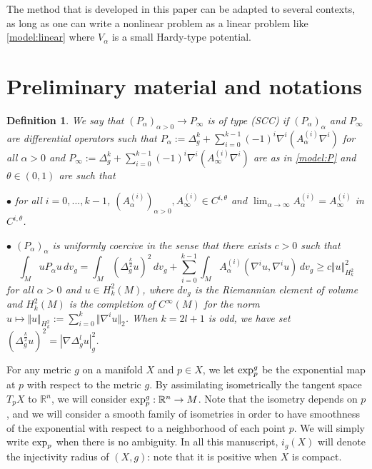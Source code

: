 \documentclass[reqno]{amsart}
\newtheorem{defi}{Definition}[section]
\def \rn {\mathbb{R}^n}
\begin{document}
\smallskip\noindent The method that is developed in this paper can be adapted to several contexts, as long as one can write a nonlinear problem as a linear problem like \eqref{model:linear} where $V_\alpha$ is a small Hardy-type potential.

 
\section{Preliminary material and notations}


\begin{defi}\label{def:scc} We say that $(P_\alpha)_{\alpha>0}\to P_\infty$ is of type (SCC) if $(P_\alpha)_\alpha$ and $P_\infty$ are differential operators such that $P_\alpha:=\Delta_g^k+\sum_{i=0}^{k-1} (-1)^i\nabla^i(A^{(i)}_\alpha \nabla^i)$ for all $\alpha>0$ and $P_\infty:=\Delta_g^k+\sum_{i=0}^{k-1} (-1)^i\nabla^i(A^{(i)}_\infty \nabla^i)$ are as in \eqref{model:P} and $\theta\in (0,1)$ are such that \par
\noindent$\bullet$ for all $i=0,...,k-1$, $(A^{(i)}_\alpha)_{\alpha>0}, A^{(i)}_\infty\in C^{i,\theta}$ and $\lim_{\alpha\to \infty}A_\alpha^{(i)}=A_\infty^{(i)}$ in $C^{i,\theta}$. \par
\noindent$\bullet$  $(P_\alpha)_{\alpha}$ is uniformly coercive in the sense that there exists $c>0$ such that
$$\int_M u P_\alpha u\, dv_g=\int_M (\Delta_g^{\frac{k}{2}}u)^2\, dv_g+\sum_{i=0}^{k-1}\int_M A^{(i)}_\alpha(\nabla^iu,\nabla^i u)\, dv_g\geq c\Vert u\Vert_{H_k^2}^2$$
for all $\alpha>0$ and $u\in H_k^2(M)$, where $dv_g$ is the Riemannian element of volume and $H_k^2(M)$ is the completion of $C^\infty(M)$ for the norm $u\mapsto\Vert u\Vert_{H_k^2}:= \sum_{i=0}^{k}\Vert\nabla^iu\Vert_2$.
When $k=2l+1$ is odd, we have set $(\Delta_g^{\frac{k}{2}}u)^2=|\nabla \Delta_g^l u|^2_g$. 
\end{defi}


For any metric $g$ on a manifold $X$ and $p\in X$, we let $\hbox{exp}_p^g$ be the exponential map at $p$ with respect to the metric $g$. By assimilating isometrically the tangent space $T_pX$ to $\rn$, we will consider $\hbox{exp}_p^g:\rn\to M$. Note that the isometry depends on $p$, and we will consider a smooth family of isometries in order to have smoothness of the exponential with respect to a neighborhood of each point $p$. We will simply write $\hbox{exp}_p$ when there is no ambiguity.  In all this manuscript, $i_g(X)$ will denote the injectivity radius of $(X,g)$: note that it is positive when $X$ is compact.
\end{document}
